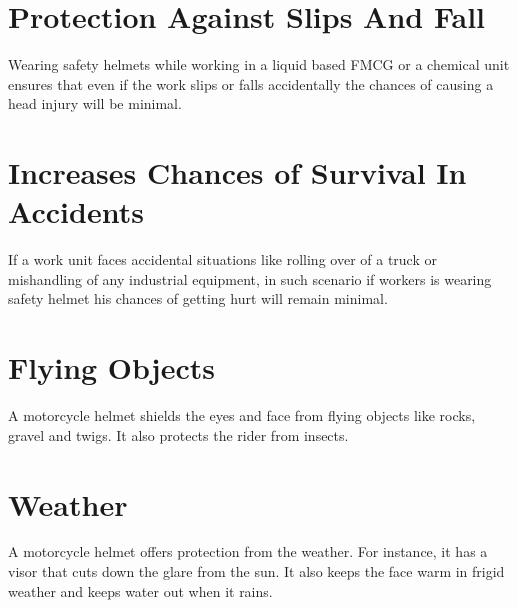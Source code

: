 \section{Protection Against Slips And Fall}

Wearing safety helmets while working in a liquid based FMCG or a chemical unit ensures that even if the work slips or falls accidentally the chances of causing a head injury will be minimal.
\vspace{.9cm}

\section{Increases Chances of Survival In Accidents}

If a work unit faces accidental situations like rolling over of a truck or mishandling of any industrial equipment, in such scenario if workers is wearing safety helmet his chances of getting hurt will remain minimal.
\vspace{.9cm}
\section{Flying Objects}

A motorcycle helmet shields the eyes and face from flying objects like rocks, gravel and twigs. It also protects the rider from insects.
\vspace{.9cm}

\section{Weather}

A motorcycle helmet offers protection from the weather. For instance, it has a visor that cuts down the glare from the sun. It also keeps the face warm in frigid weather and keeps water out when it rains.